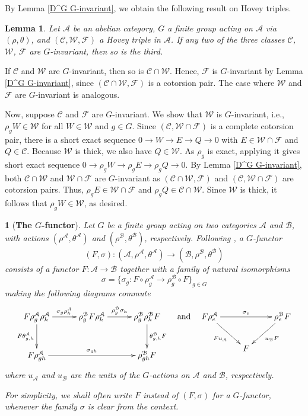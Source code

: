 \documentclass[12pt,twoside]{amsart}
\theoremstyle{bfupright head,slanted body}
\theoremstyle{bfupright head,upright body}
\newtheorem{bfhpg}[res]{}               \newtheorem*{bfhpg*}{}
\theoremstyle{fixed bf head,slanted body}
\newtheorem{lem}[res]{Lemma}            \newtheorem*{lem*}{Lemma}
\theoremstyle{fixed bf head,upright body}
\theoremstyle{numbered paragraph}
\newenvironment{prf*}[1][Proof]{%
  \begin{proof}[\bf #1]
    \setcounter{equation}{0}
    \renewcommand{\theequation}{\arabic{equation}}}
  {\end{proof}
}
\numberwithin{equation}{res}
\newcommand{\calC}{\mathcal{C}}
\newcommand{\calW}{\mathcal{W}}
\newcommand{\calF}{\mathcal{F}}
\newcommand{\calA}{\mathcal{A}}
\newcommand{\calB}{\mathcal{B}}
\begin{document}
By Lemma \ref{D^G G-invariant}, we obtain the following result on Hovey triples.

\begin{lem} \label{(Q,W,R) G-invariant}
Let $\calA$ be an abelian category, $G$ a finite group acting on $\calA$ via $(\rho,\theta)$, and $(\calC,\calW,\calF)$ a Hovey triple in $\calA$.
If any two of the three classes $\calC$, $\calW$, $\calF$ are $G$-invariant, then so is the third.
\end{lem}

\begin{prf*}
If $\calC$ and $\calW$ are $G$-invariant, then so is $\calC\cap\calW$. Hence, $\calF$ is $G$-invariant by Lemma \ref{D^G G-invariant}, since $(\calC\cap\calW,\calF)$ is a cotorsion pair. The case where $\calW$ and $\calF$ are $G$-invariant is analogous.

Now, suppose $\calC$ and $\calF$ are $G$-invariant. We show that $\calW$ is $G$-invariant, i.e., $\rho_g W \in \calW$ for all $W\in\calW$ and $g\in G$.
Since $(\calC,\calW\cap\calF)$ is a complete cotorsion pair, there is a short exact sequence $0\to W\to E\to Q\to 0$ with $E\in\calW\cap\calF$ and $Q\in\calC$.
Because $\calW$ is thick, we also have $Q\in\calW$.
As $\rho_g$ is exact, applying it gives short exact sequence
$0\to \rho_g W\to \rho_g E\to \rho_g Q\to 0$.
By Lemma \ref{D^G G-invariant}, both $\calC\cap\calW$ and $\calW\cap\calF$ are $G$-invariant as $(\calC\cap\calW,\calF)$ and $(\calC,\calW\cap\calF)$ are cotorsion pairs. Thus, $\rho_g E\in\calW\cap\calF$ and $\rho_g Q\in\calC\cap\calW$.
Since $\calW$ is thick, it follows that $\rho_g W\in\calW$, as desired.
\end{prf*}

\begin{bfhpg}[\bf The \(G\)-functor] \label{G fun}
Let \(G\) be a finite group acting on two categories \(\calA\) and \(\calB\), with actions \((\rho^\calA,\theta^\calA)\) and \((\rho^\calB,\theta^\calB)\), respectively.
Following \cite{2025Equ}, a \(G\)-\emph{functor}
\[
(F,\sigma) : (\calA,\rho^\calA,\theta^\calA) \to (\calB,\rho^\calB,\theta^\calB)
\]
consists of a functor \(F : \calA \to \calB\) together with a family of natural isomorphisms
\[
\sigma=\{\sigma_g : F\circ\rho^\calA_g \rightarrow \rho^\calB_g\circ F\}_{g\in G}
\]
making the following diagrams commute
\[
\xymatrix@R=1cm@C=1cm{
   F \rho^\calA_g \rho^\calA_h
\ar[r]^-{\sigma_g \rho^\calA_h}
\ar[d]_-{F \theta^\calA_{g,h}}
&  \rho^\calB_g F \rho^\calA_h
\ar[r]^-{\rho^\calB_g \sigma_h}
&  \rho^\calB_g \rho^\calB_h F
\ar[d]^-{\theta^\calB_{g,h} F }      \\
   F \rho^\calA_{gh}
\ar[rr]^-{\sigma_{gh}}
&&  \rho^\calB_{gh}F                 }
\quad\text{and}\quad
\xymatrix{
   F \rho^\calA_e
\ar[rr]^-{\sigma_e}
\ar[dr]_-{Fu_{\calA}}
&& \rho^\calB_e F
\ar[dl]^-{u_{\calB} F}               \\
&  F                              }
\]
where \(u_\calA\) and \(u_\calB\) are the units of the \(G\)-actions on \(\calA\) and \(\calB\), respectively.

For simplicity, we shall often write \(F\) instead of \((F,\sigma)\) for a \(G\)-functor, whenever the family \(\sigma\) is clear from the context.
\end{bfhpg}
\end{document}
